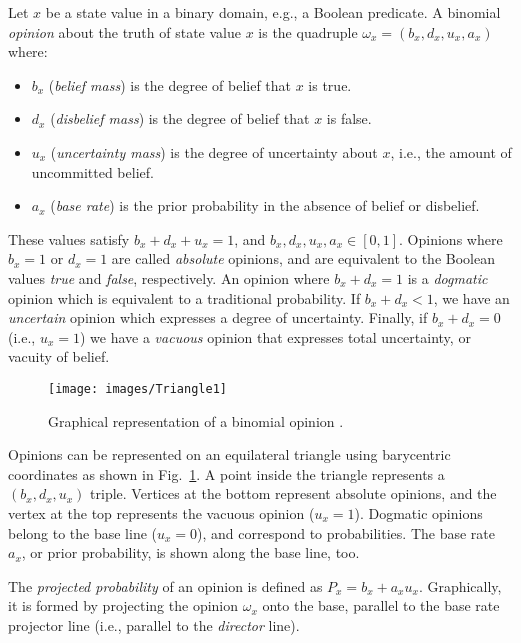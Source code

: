 Let $x$ be a state value in a binary domain, e.g., a Boolean predicate. A binomial \emph{opinion} about the truth of state value $x$ is the quadruple $\omega_{x}=(b_{x},d_{x},u_{x},a_{x})$ where:

\begin{itemize}
\item $b_{x}$ (\emph{belief mass}) is the degree of belief that $x$ is true.
\item $d_{x}$ (\emph{disbelief mass}) is the degree of {belief} that $x$ is false.
\item $u_{x}$ (\emph{uncertainty mass}) is the degree of uncertainty about $x$, i.e., the amount of uncommitted belief.
\item $a_{x}$ (\emph{base rate}) is the prior probability in the absence of belief or disbelief.
\end{itemize}

These values satisfy $b_{x}+d_{x}+u_{x}=1$, and $b_{x},d_{x},u_{x},a_{x}\in [0,1]$.
Opinions where $b_{x}=1$ or $d_{x}=1$ are called  \emph{absolute} opinions, and are equivalent to the Boolean values \textit{true} and \textit{false}, respectively. An opinion where $b_{x}+d_{x}=1$	is a \emph{dogmatic} opinion which is equivalent to a traditional probability. If $b_{x}+d_{x}<1$, we have an \emph{uncertain} opinion which expresses a degree of uncertainty. Finally, if $b_{x}+d_{x}=0$	(i.e., $u_x=1$) we have a \emph{vacuous} opinion that expresses total uncertainty, or vacuity of belief.

\begin{figure}[t!]
\centering
\texttt{[image: images/Triangle1]}
\caption{Graphical representation of a binomial opinion \cite{Josang16}.}
\label{fig:opinion}
\end{figure}

Opinions can be represented on an equilateral triangle using barycentric coordinates as shown in Fig.~\ref{fig:opinion}. A point inside the triangle represents a $(b_{x},d_{x},u_{x})$ triple. Vertices at the bottom represent absolute opinions, and the vertex at the top represents the vacuous opinion ($u_x=1$). Dogmatic opinions belong to the base line ($u_x=0$), and correspond to probabilities. The base rate $a_x$, or prior probability, is shown along the base line, too. 

The \emph{projected probability} of an opinion is defined as ${P}_{x}=b_{x}+a_{x}u_{x}$. Graphically, it is formed by projecting the opinion $\omega_x$ onto the base, parallel to the base rate projector line (i.e., parallel to the \emph{director} line).

